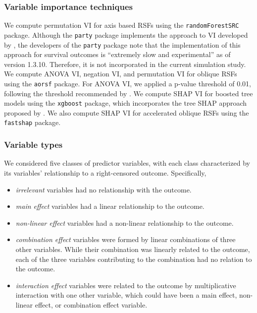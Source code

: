 \documentclass[twoside,11pt]{article}\usepackage[]{graphicx}\usepackage[]{xcolor}
\begin{document}
\subsubsection{Variable importance techniques}

We compute permutation VI for axis based RSFs using the \texttt{randomForestSRC} package. Although the \texttt{party} package implements the approach to VI developed by \citet{strobl2007bias}, the developers of the \texttt{party} package note that the implementation of this approach for survival outcomes is ``extremely slow and experimental'' as of version 1.3.10. Therefore, it is not incorporated in the current simulation study. We compute ANOVA VI, negation VI, and permutation VI for oblique RSFs using the \texttt{aorsf} package. For ANOVA VI, we applied a p-value threshold of 0.01, following the threshold recommended by \citet{menze2011oblique}. We compute SHAP VI for boosted tree models using the \texttt{xgboost} package, which incorporates the tree SHAP approach proposed by \citet{lundberg2018consistent}. We also compute SHAP VI for accelerated oblique RSFs using the \texttt{fastshap} package.

\subsubsection{Variable types}

We considered five classes of predictor variables, with each class characterized by its variables' relationship to a right-censored outcome. Specifically, \begin{itemize}
\item \textit{irrelevant} variables had no relationship with the outcome.
\item \textit{main effect} variables had a linear relationship to the outcome.
\item \textit{non-linear effect} variables had a non-linear relationship to the outcome.
\item \textit{combination effect} variables were formed by linear combinations of three other variables. While their combination was linearly related to the outcome, each of the three variables contributing to the combination had no relation to the outcome.
\item \textit{interaction effect} variables were related to the outcome by multiplicative interaction with one other variable, which could have been a main effect, non-linear effect, or combination effect variable.
\end{itemize}
\end{document}
